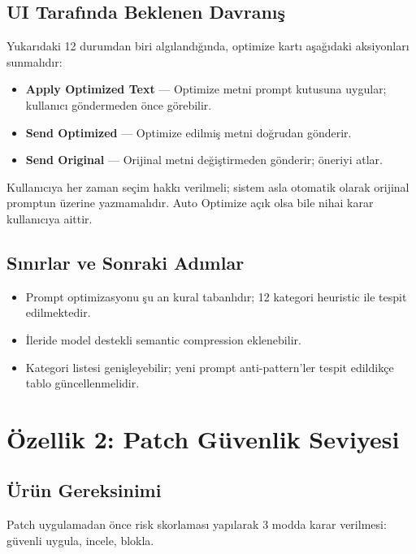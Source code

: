 \documentclass[11pt,a4paper]{article}
\begin{document}
\subsection{UI Tarafında Beklenen Davranış}

Yukarıdaki 12 durumdan biri algılandığında, optimize kartı aşağıdaki aksiyonları sunmalıdır:

\begin{notebox}
\begin{itemize}[leftmargin=1.2em,nosep]
  \item \textbf{Apply Optimized Text} — Optimize metni prompt kutusuna uygular; kullanıcı göndermeden önce görebilir.
  \item \textbf{Send Optimized} — Optimize edilmiş metni doğrudan gönderir.
  \item \textbf{Send Original} — Orijinal metni değiştirmeden gönderir; öneriyi atlar.
\end{itemize}
\end{notebox}

\begin{warnbox}
Kullanıcıya her zaman seçim hakkı verilmeli; sistem asla otomatik olarak orijinal promptun üzerine yazmamalıdır. Auto Optimize açık olsa bile nihai karar kullanıcıya aittir.
\end{warnbox}

\subsection{Sınırlar ve Sonraki Adımlar}
\begin{itemize}[leftmargin=1.5em]
  \item Prompt optimizasyonu şu an kural tabanlıdır; 12 kategori heuristic ile tespit edilmektedir.
  \item İleride model destekli semantic compression eklenebilir.
  \item Kategori listesi genişleyebilir; yeni prompt anti-pattern'ler tespit edildikçe tablo güncellenmelidir.
\end{itemize}

\section{Özellik 2: Patch Güvenlik Seviyesi}

\subsection{Ürün Gereksinimi}
Patch uygulamadan önce risk skorlaması yapılarak 3 modda karar verilmesi: güvenli uygula, incele, blokla.
\end{document}
